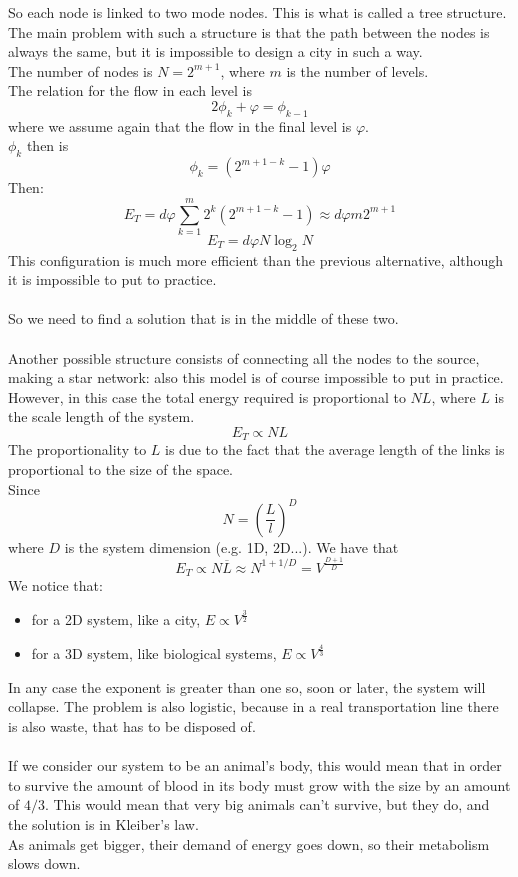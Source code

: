 So each node is linked to two mode nodes. This is what is called a tree structure. \\
The main problem with such a structure is that the path between the nodes is always the same, but it is impossible to design a city in such a way. \\
The number of nodes is $N = 2^{m+1}$, where $m$ is the number of levels. \\
The relation for the flow in each level is
$$
	2\phi_k + \varphi = \phi_{k-1}
$$
where we assume again that the flow in the final level is $\varphi$. \\
$\phi_k$ then is
$$
	\phi_k = (2^{m+1-k}-1)\varphi
$$
Then:
$$
	E_T = d\varphi\sum_{k=1}^m 2^k(2^{m+1-k}-1) \approx d\varphi m 2^{m+1}	
$$
$$
	E_T = d\varphi N \log_2N
$$
This configuration is much more efficient than the previous alternative, although it is impossible to put to practice. \\ \\ 
So we need to find a solution that is in the middle of these two. \\ \\
Another possible structure consists of connecting all the nodes to the source, making a star network: also this model is of course impossible to put in practice. \\
However, in this case the total energy required is proportional to $NL$, where $L$ is the scale length of the system. 
$$
	E_T \propto NL
$$
The proportionality to $L$ is due to the fact that the average length of the links is proportional to the size of the space. \\
Since 
$$
	N = \left(\frac{L}{l} \right)^D
$$
where $D$ is the system dimension (e.g. 1D, 2D...).
We have that
$$
	E_T \propto N\overline{L} \approx N^{1+1/D} = V^{\frac{D+1}{D}}
$$
We notice that:
\begin{itemize}
	\item for a 2D system, like a city, $E \propto V^{\frac{3}{2}}$
	\item for a 3D system, like biological systems, $E \propto V^{\frac{4}{3}}$
\end{itemize}
In any case the exponent is greater than one so, soon or later, the system will collapse.
The problem is also logistic, because in a real transportation line there is also waste, that has to be disposed of. \\ \\
If we consider our system to be an animal's body, this would mean that in order to survive the amount of blood in its body must grow with the size by an amount of $4/3$. This would mean that very big animals can't survive, but they do, and the solution is in Kleiber's law. \\
As animals get bigger, their demand of energy goes down, so their metabolism slows down.  




